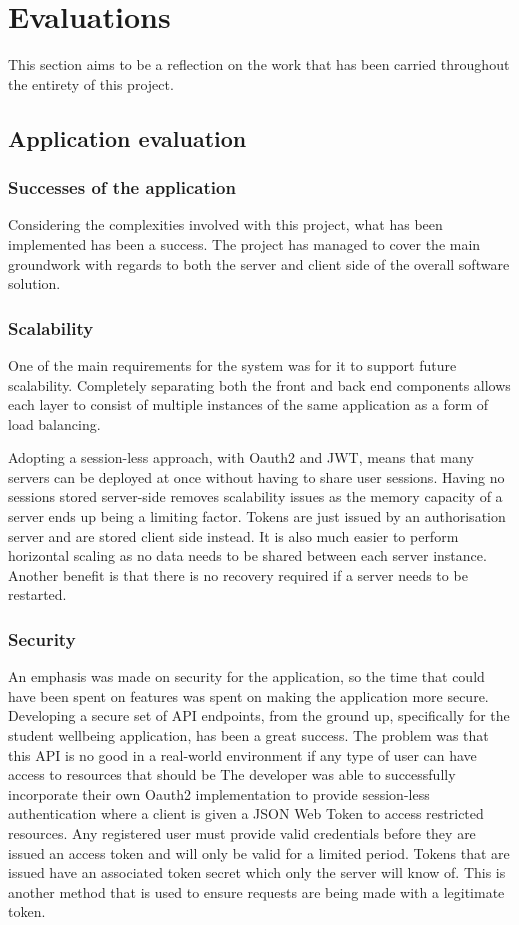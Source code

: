 \section{Evaluations}

This section aims to be a reflection on the work that has been carried throughout the entirety of this project.

\subsection{Application evaluation}

\subsubsection{Successes of the application}
Considering the complexities involved with this project, what has been implemented has been a success.
The project has managed to cover the main groundwork with regards to both the server and client side of the overall 
software solution.


\subsubsection*{Scalability}
One of the main requirements for the system was for it to support future scalability.
Completely separating both the front and back end components allows each layer to consist of multiple instances of the same application as 
a form of load balancing.

Adopting a session-less approach, with Oauth2 and JWT, means that many servers can be deployed at once without having to share user sessions.
Having no sessions stored server-side removes scalability issues as the memory capacity of a server ends up being a limiting factor.
Tokens are just issued by an authorisation server and are stored client side instead.
It is also much easier to perform horizontal scaling as no data needs to be shared between each server instance.
Another benefit is that there is no recovery required if a server needs to be restarted.

\subsubsection*{Security}
An emphasis was made on security for the application, so the time that could have been spent on features was spent on making the application more secure.
Developing a secure set of API endpoints, from the ground up, specifically for the student wellbeing application, has been a great success.
The problem was that this API is no good in a real-world environment if any type of user can have access to resources that should be 
The developer was able to successfully incorporate their own Oauth2 implementation to provide session-less authentication where a client is given
a JSON Web Token to access restricted resources.
Any registered user must provide valid credentials before they are issued an access token and will only be valid for a limited period.
Tokens that are issued have an associated token secret which only the server will know of. This is another method that is used to ensure requests are being made with a legitimate token.

